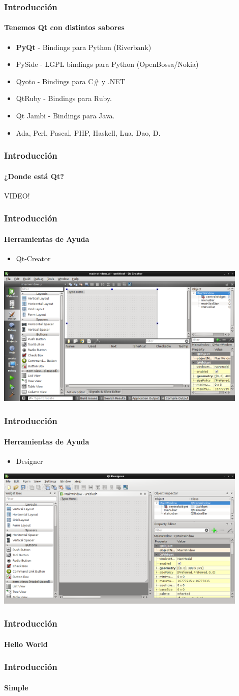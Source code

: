 \frame
{
\frametitle{Introducción}
\framesubtitle{Tenemos Qt con distintos sabores}
\begin{itemize}
	\item \textbf{PyQt} - Bindings  para Python (Riverbank)
	\item PySide - LGPL bindings para Python (OpenBossa/Nokia)
	\item Qyoto - Bindings para C\# y .NET
	\item QtRuby - Bindings para Ruby.
	\item Qt Jambi - Bindings para Java.
	\item Ada, Perl, Pascal, PHP, Haskell, Lua, Dao, D.
\end{itemize}
}

\frame
{
\frametitle{Introducción}
\framesubtitle{¿Donde está Qt?}
\vspace{1cm}
\begin{center}
	VIDEO! 
\end{center}
}


\frame
{
\frametitle{Introducción}
\framesubtitle{Herramientas de Ayuda}
\begin{itemize}
	\item Qt-Creator
\end{itemize}
\begin{center}
	\includegraphics[width=0.9\textwidth]{img/qtcreator}
\end{center}
}

\frame
{
\frametitle{Introducción}
\framesubtitle{Herramientas de Ayuda}
\begin{itemize}
	\item Designer
\end{itemize}
\begin{center}
	\includegraphics[width=0.9\textwidth]{img/designer}
\end{center}
}

\frame
{
\frametitle{Introducción}
\framesubtitle{Hello World}
\lstset{language=Python}

}

\frame
{
\frametitle{Introducción}
\framesubtitle{Simple}
\lstset{language=Python}

}
